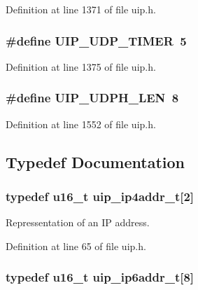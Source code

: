 Definition at line 1371 of file uip.h.

\hypertarget{group__uip_gaf0ccbc3bb2a3ba1ebc255c7b3fcedd24}{
\subsubsection[{UIP\_\-UDP\_\-TIMER}]{\setlength{\rightskip}{0pt plus 5cm}\#define UIP\_\-UDP\_\-TIMER~5}}
\label{group__uip_gaf0ccbc3bb2a3ba1ebc255c7b3fcedd24}


Definition at line 1375 of file uip.h.

\hypertarget{group__uip_gab948296aea6b6b3aa1f156799c4d479c}{
\subsubsection[{UIP\_\-UDPH\_\-LEN}]{\setlength{\rightskip}{0pt plus 5cm}\#define UIP\_\-UDPH\_\-LEN~8}}
\label{group__uip_gab948296aea6b6b3aa1f156799c4d479c}


Definition at line 1552 of file uip.h.



\subsection{Typedef Documentation}
\hypertarget{group__uip_ga20ceef9d0868d391c2f33041b02cb1f1}{
\subsubsection[{uip\_\-ip4addr\_\-t}]{\setlength{\rightskip}{0pt plus 5cm}typedef {\bf u16\_\-t} {\bf uip\_\-ip4addr\_\-t}\mbox{[}2\mbox{]}}}
\label{group__uip_ga20ceef9d0868d391c2f33041b02cb1f1}
Repressentation of an IP address. 

Definition at line 65 of file uip.h.

\hypertarget{group__uip_ga9ebb4dac683163840eab9c6c41ad61f7}{
\subsubsection[{uip\_\-ip6addr\_\-t}]{\setlength{\rightskip}{0pt plus 5cm}typedef {\bf u16\_\-t} {\bf uip\_\-ip6addr\_\-t}\mbox{[}8\mbox{]}}}
\label{group__uip_ga9ebb4dac683163840eab9c6c41ad61f7}


